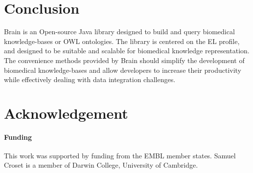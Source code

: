 \documentclass{bioinfo}
\begin{document}
\section{Conclusion}
Brain is an Open-source Java library designed to build and query biomedical knowledge-bases or OWL ontologies.
The library is centered on the EL profile, and designed to be suitable and scalable for biomedical knowledge representation. 
The convenience methods provided by Brain should simplify the development of biomedical knowledge-bases and allow developers
to increase their productivity while effectively dealing with data integration challenges.

\section*{Acknowledgement}
\paragraph{Funding\textcolon}
This work was supported by funding from the EMBL member states. Samuel Croset is a member of Darwin College, University of Cambridge.
 
%  
%  
%  
%  
%  
% 
%  
% 
%  
 
\end{document}
